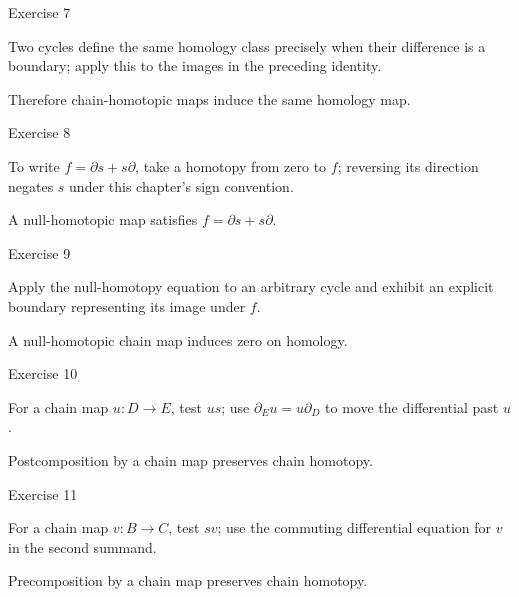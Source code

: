 \begin{exercise}\label{exr:viii22-07}
Exercise 7
\end{exercise}
\begin{hint}
Two cycles define the same homology class precisely when their difference is a boundary; apply this to the images in the preceding identity.
\end{hint}
\begin{solution}
Therefore chain-homotopic maps induce the same homology map.
\end{solution}

\begin{exercise}\label{exr:viii22-08}
Exercise 8
\end{exercise}
\begin{hint}
To write \(f=\partial s+s\partial\), take a homotopy from zero to \(f\); reversing its direction negates \(s\) under this chapter's sign convention.
\end{hint}
\begin{solution}
A null-homotopic map satisfies \(f=\partial s+s\partial\).
\end{solution}

\begin{exercise}\label{exr:viii22-09}
Exercise 9
\end{exercise}
\begin{hint}
Apply the null-homotopy equation to an arbitrary cycle and exhibit an explicit boundary representing its image under \(f\).
\end{hint}
\begin{solution}
A null-homotopic chain map induces zero on homology.
\end{solution}

\begin{exercise}\label{exr:viii22-10}
Exercise 10
\end{exercise}
\begin{hint}
For a chain map \(u:D\to E\), test \(us\); use \(\partial_Eu=u\partial_D\) to move the differential past \(u\).
\end{hint}
\begin{solution}
Postcomposition by a chain map preserves chain homotopy.
\end{solution}

\begin{exercise}\label{exr:viii22-11}
Exercise 11
\end{exercise}
\begin{hint}
For a chain map \(v:B\to C\), test \(sv\); use the commuting differential equation for \(v\) in the second summand.
\end{hint}
\begin{solution}
Precomposition by a chain map preserves chain homotopy.
\end{solution}

